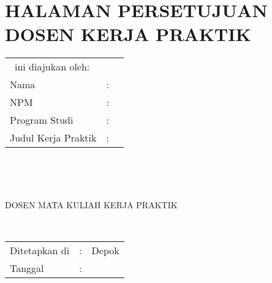 %
%
%

\chapter*{HALAMAN PERSETUJUAN DOSEN KERJA PRAKTIK}
\thispagestyle{empty}
\vspace*{0.4cm}
\noindent

\noindent
\begin{tabular}{ll p{9cm}}
	\multicolumn{3}{l}{\type~ini diajukan oleh:}  \\
	Nama&: & \penulisSatu \\
	NPM&: & \npmSatu \\
	Program Studi&: & \programSatu \\
	Judul Kerja Praktik&: & \judul \\
\end{tabular} \\

\vspace*{1.0cm}

\noindent {}\\[0.2cm]

\begin{center}
	DOSEN MATA KULIAH KERJA PRAKTIK\\[2cm]
\end{center}

\begin{center}
	\underline{\pembimbingSatu}\\[0.1cm]
\end{center}

\vspace*{2.0cm}

\begin{tabular}{ll l}
	Ditetapkan di&: & Depok\\
	Tanggal&: & \tanggalLulus \\
\end{tabular}

\newpage
